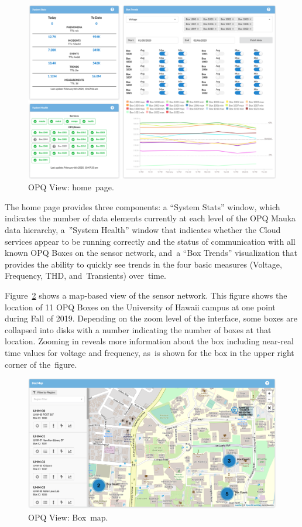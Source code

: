 \documentclass[energies,article,accept,moreauthors,pdftex]{Definitions/mdpi}
\begin{document}
\begin{figure}[H]
\center \includegraphics[width=5in]{images/view/homepage.png}
\caption{OPQ View: home~page.}
\label{fig:opq-view-home}
\end{figure}

The home page provides three components: a ``System Stats'' window, which indicates the number of data elements currently at each level of the OPQ Mauka data hierarchy, a~''System Health'' window that indicates whether the Cloud services appear to be running correctly and the status of communication with all known OPQ Boxes on the sensor network, and~a ``Box Trends'' visualization that provides the ability to quickly see trends in the four basic measures (Voltage, Frequency, THD, and~Transients) over~time.

Figure~\ref{fig:opq-view-box-map} shows a map-based view of the sensor network. This figure shows the location of 11 OPQ Boxes on the University of Hawaii campus at one point during Fall of 2019. Depending on the zoom level of the interface, some boxes are collapsed into disks with a number indicating the number of boxes at that location. Zooming in reveals more information about the box including near-real time values for voltage and frequency, as~is shown for the box in the upper right corner of the~figure.

\begin{figure}[H]
\center \includegraphics[width=5in]{images/view/boxmap-2.png}
\caption{OPQ View: Box~map.}
\label{fig:opq-view-box-map}
\end{figure}
\end{document}
